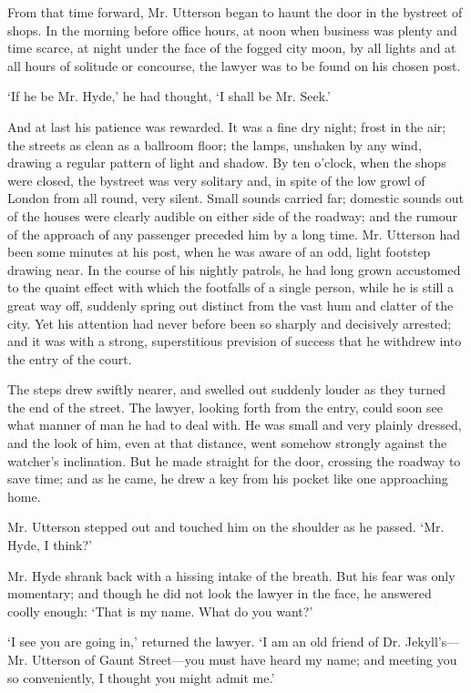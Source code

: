 \documentclass[]{novel}
\begin{document}
From that time forward, Mr. Utterson began to haunt the door in the bystreet of shops. In the morning before office hours, at noon when business was plenty and time scarce, at night under the face of the fogged city moon, by all lights and at all hours of solitude or concourse, the lawyer was to be found on his chosen post.

‘If he be Mr. Hyde,’ he had thought, ‘I shall be Mr. Seek.’

And at last his patience was rewarded. It was a fine dry night; frost in the air; the streets as clean as a ballroom floor; the lamps, unshaken by any wind, drawing a regular pattern of light and shadow. By ten o’clock, when the shops were closed, the bystreet was very solitary and, in spite of the low growl of London from all round, very silent. Small sounds carried far; domestic sounds out of the houses were clearly audible on either side of the roadway; and the rumour of the approach of any passenger preceded him by a long time. Mr. Utterson had been some minutes at his post, when he was aware of an odd, light footstep drawing near. In the course of his nightly patrols, he had long grown accustomed to the quaint effect with which the footfalls of a single person, while he is still a great way off, suddenly spring out distinct from the vast hum and clatter of the city. Yet his attention had never before been so sharply and decisively arrested; and it was with a strong, superstitious prevision of success that he withdrew into the entry of the court.

The steps drew swiftly nearer, and swelled out suddenly louder as they turned the end of the street. The lawyer, looking forth from the entry, could soon see what manner of man he had to deal with. He was small and very plainly dressed, and the look of him, even at that distance, went somehow strongly against the watcher’s inclination. But he made straight for the door, crossing the roadway to save time; and as he came, he drew a key from his pocket like one approaching home.

Mr. Utterson stepped out and touched him on the shoulder as he passed. ‘Mr. Hyde, I think?’

Mr. Hyde shrank back with a hissing intake of the breath. But his fear was only momentary; and though he did not look the lawyer in the face, he answered coolly enough: ‘That is my name. What do you want?’

‘I see you are going in,’ returned the lawyer. ‘I am an old friend of Dr. Jekyll’s—Mr. Utterson of Gaunt Street—you must have heard my name; and meeting you so conveniently, I thought you might admit me.’
\end{document}
